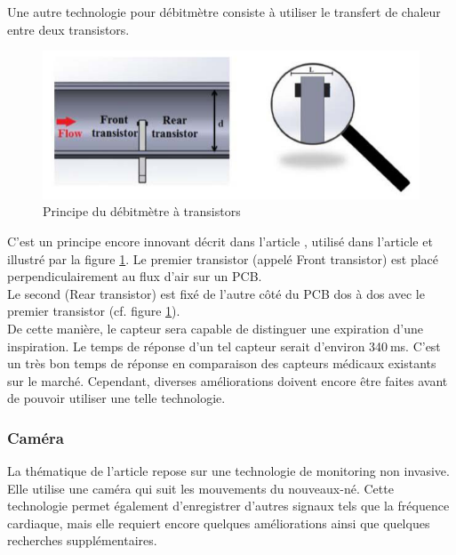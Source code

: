 Une autre technologie pour débitmètre consiste à utiliser le transfert de chaleur entre deux transistors. 
\begin{figure}[H]
    \centering
    \includegraphics[scale = 0.5]{images/Debitmetre_transistors.png}
    \caption{Principe du débitmètre à transistors}
    \label{fig:transistors}
\end{figure}

C'est un principe encore innovant décrit dans l'article \cite{giorgino_design_2014}, utilisé dans l'article \cite{rosi_device_2016} et illustré 
par la figure \ref{fig:transistors}. 
Le premier transistor (appelé Front transistor) est placé perpendiculairement au flux d'air sur un PCB. \\
Le second (Rear transistor) est fixé de l'autre côté du PCB dos à dos avec le premier transistor (cf. figure \ref{fig:transistors}). \\
De cette manière, le capteur sera capable de distinguer une expiration d'une inspiration. Le temps de réponse d'un tel capteur serait 
d'environ 340 ms. C'est un très bon temps de réponse en comparaison des capteurs médicaux existants sur le marché. Cependant, diverses améliorations 
doivent encore être faites avant de pouvoir utiliser une telle technologie. 

\subsubsection{Caméra}
La thématique de l'article \cite{villarroel_non-contact_2019} repose sur une technologie de monitoring non invasive. Elle utilise une caméra qui suit les mouvements du nouveaux-né. 
Cette technologie permet également d'enregistrer d'autres signaux tels que la fréquence cardiaque, mais elle requiert encore quelques améliorations 
ainsi que quelques recherches supplémentaires. 

